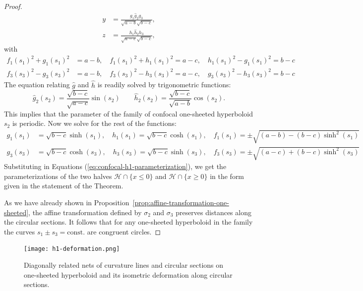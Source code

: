 \documentclass[10pt, a4paper]{article}
\theoremstyle{BoldTopSpacing}
\theoremstyle{BoldTopSpacing}
\theoremstyle{BoldTopSpacing}
\theoremstyle{BoldTopBottomSpacing}
\theoremstyle{BoldTopSpacing}
\theoremstyle{BoldTopBottomSpacing}
\theoremstyle{remark}
\begin{document}
\begin{proof}
\begin{equation}
\begin{aligned}
    y &= \frac{g_1 \hat{g}_{2} g_3}{\sqrt{a-b}\sqrt{b-c}}, \\
    z &= \frac{h_1 \hat{h}_{2} h_3}{\sqrt{a-c}\sqrt{b-c}},
\end{aligned}
\end{equation}
with
\begin{equation*}
\begin{aligned}
f_{1}(s_{1})^2 + g_{1}(s_{1})^2 &= a - b, \quad f_{1}(s_{1})^2 + h_{1}(s_{1})^2 = a - c, \quad h_{1}(s_{1})^2 - g_{1}(s_{1})^2 = b - c \\
f_{3}(s_{3})^2 - g_{3}(s_{3})^2 &= a - b, \quad f_{3}(s_{3})^2 - h_{3}(s_{3})^2 = a - c, \quad g_{3}(s_{3})^2 - h_{3}(s_{3})^2 = b - c
\end{aligned}
\end{equation*}
The equation relating $\hat{g}$ and $\hat{h}$ is readily solved by trigonometric functions:
\[
\hat{g}_{2}(s_{2}) = \frac{\sqrt{b - c}}{\sqrt{a - c}} \sin(s_{2}) \quad \quad \hat{h}_{2}(s_{2}) = \frac{\sqrt{b - c}}{\sqrt{a - b}} \cos(s_{2}).
\]
This implies that the parameter of the family of confocal one-sheeted hyperboloid $s_2$ is periodic. Now we solve for the rest of the functions:
\begin{equation*}
\begin{aligned}
g_{1}(s_{1}) &= \sqrt{b - c} \sinh(s_{1}), \quad h_{1}(s_{1}) = \sqrt{b - c} \cosh(s_{1}), \quad f_{1}(s_{1}) = \pm \sqrt{(a - b) - (b - c)\sinh^2(s_{1})} \\
g_{3}(s_{3}) &= \sqrt{b - c} \cosh(s_{3}), \quad h_{3}(s_{3}) = \sqrt{b - c} \sinh(s_{3}), \quad f_{3}(s_{3}) = \pm \sqrt{(a - c) + (b - c)\sinh^2(s_{3})}
\end{aligned}
\end{equation*}
\sloppy Substituting in Equations (\ref{eq:confocal-h1-parameterization}), we get the parameterizations of the two halves ${\mathcal{H} \cap \{ x \leq 0\}}$ and ${\mathcal{H} \cap \{ x \geq 0\}}$ in the form given in the statement of the Theorem. \par
As we have already shown in Proposition~\ref{prop:affine-transformation-one-sheeted}, the affine transformation defined by $\sigma_2$ and $\sigma_3$ preserves distances along the circular sections. It follows that for any one-sheeted hyperboloid in the family the curves $s_{1} \pm s_{3} = \text{const.}$ are congruent circles.
\end{proof}

\begin{figure}[H]
    \centering
    \texttt{[image: h1-deformation.png]}
    \caption[Isometric deformation of one-sheeted hyperboloid along circular sections.]{Diagonally related nets of curvature lines and circular sections on one-sheeted hyperboloid and its isometric deformation along circular sections.}
    \label{fig:h1-deform}
\end{figure}
\end{document}
